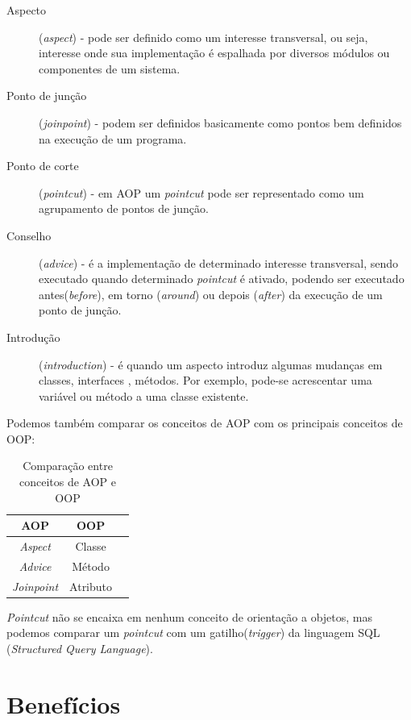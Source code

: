 \documentclass[tc,openright]{iiufrgs}
\begin{document}
\begin{description}
\item [Aspecto] (\textit{aspect}) - pode ser definido como um interesse transversal, ou seja, interesse onde sua implementação é espalhada por diversos módulos ou componentes de um sistema.
\item [Ponto de junção] (\textit{joinpoint}) - podem ser definidos basicamente como pontos bem definidos na execução de um programa.
\item [Ponto de corte] (\textit{pointcut}) - em AOP um \textit{pointcut} pode ser representado como um agrupamento de pontos de junção.
\item [Conselho] (\textit{advice}) - é a implementação de determinado interesse transversal, sendo executado quando determinado \textit{pointcut} é ativado, podendo ser executado antes(\textit{before}), em torno (\textit{around}) ou depois (\textit{after}) da execução de um ponto de junção.
\item [Introdução] (\textit{introduction}) - é quando um aspecto introduz algumas mudanças em classes, interfaces , métodos. Por exemplo, pode-se acrescentar uma variável ou método a uma classe existente. \cite{laddad2003aspectj}

\end{description}


Podemos também comparar os conceitos de AOP com os principais conceitos de OOP:

\begin{table}[ht]
	\centering
	\caption{Comparação entre conceitos de AOP e OOP}
	\begin{tabular}[h]{c c l}
		\hline 
		\textbf{AOP} & \textbf{OOP} \\
		\hline
		\textit{Aspect}&Classe \\
		\textit{Advice}&Método \\
		\textit{Joinpoint}&Atributo \\
		\hline
	\end{tabular}
	\label{tab:comparacaoAOPOOP}
\end{table}

\textit{Pointcut} não se encaixa em nenhum conceito de orientação a objetos, mas podemos comparar um \textit{pointcut} com um gatilho(\textit{trigger}) da linguagem SQL (\textit{Structured Query Language}).

\section{Benefícios}
\end{document}
